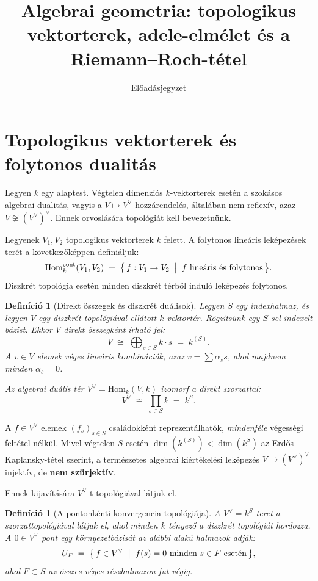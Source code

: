 \documentclass[12pt]{article}
\title{Algebrai geometria: topologikus vektorterek, adele-elmélet és a Riemann--Roch-tétel}
\author{Előadásjegyzet}
\date{}
\newtheorem{definition}[theorem]{Definíció}
\newcommand{\Hom}{\mathrm{Hom}}
\begin{document}
\maketitle


\section{Topologikus vektorterek és folytonos dualitás}

Legyen $k$ egy alaptest. Végtelen dimenziós $k$-vektorterek esetén a szokásos algebrai dualitás, vagyis a $V \mapsto V^{\vee}$ hozzárendelés, általában nem reflexív, azaz $V \not\cong (V^{\vee})^{\vee}$. Ennek orvoslására topológiát kell bevezetnünk.

Legyenek $V_1, V_2$ topologikus vektorterek $k$ felett. A folytonos lineáris leképezések terét a következőképpen definiáljuk:
\[
  \Hom_k^{\mathrm{cont}}(V_1, V_2)
  \;=\;
  \bigl\{\, f : V_1 \to V_2 \;\bigm|\; f \text{ lineáris és folytonos} \,\bigr\}.
\]
Diszkrét topológia esetén minden diszkrét térből induló leképezés folytonos.

\begin{definition}[Direkt összegek és diszkrét duálisok]
  Legyen $S$ egy indexhalmaz, és legyen $V$ egy diszkrét topológiával ellátott $k$-vektortér. Rögzítsünk egy $S$-sel indexelt bázist. Ekkor $V$ direkt összegként írható fel:
  \[
    V \;\cong\; \bigoplus_{s \in S} k \cdot s \;=\; k^{(S)}.
  \]
  A $v \in V$ elemek véges lineáris kombinációk, azaz $v = \sum \alpha_s s$, ahol majdnem minden $\alpha_s = 0$.

  Az \emph{algebrai duális tér} $V^{\vee} = \Hom_k(V, k)$ izomorf a direkt szorzattal:
  \[
    V^{\vee} \;\cong\; \prod_{s \in S} k \;=\; k^S.
  \]
\end{definition}

A $f \in V^{\vee}$ elemek $(f_s)_{s \in S}$ családokként reprezentálhatók, \emph{mindenféle} végességi feltétel nélkül. Mivel végtelen $S$ esetén $\dim(k^{(S)}) < \dim(k^S)$ az Erdős--Kaplansky-tétel szerint, a természetes algebrai kiértékelési leképezés $V \to (V^{\vee})^{\vee}$ injektív, de \textbf{nem szürjektív}.

Ennek kijavítására $V^{\vee}$-t topológiával látjuk el.

\begin{definition}[A pontonkénti konvergencia topológiája]
  A $V^{\vee} = k^S$ teret a \emph{szorzattopológiával} látjuk el, ahol minden $k$ tényező a diszkrét topológiát hordozza. A $0 \in V^{\vee}$ pont egy környezetbázisát az alábbi alakú halmazok adják:
  \[
    U_F \;=\; \bigl\{\, f \in V^{\vee} \;\bigm|\; f(s) = 0 \text{ minden } s \in F \text{ esetén} \,\bigr\},
  \]
  ahol $F \subset S$ az összes véges részhalmazon fut végig.
\end{definition}
\end{document}
